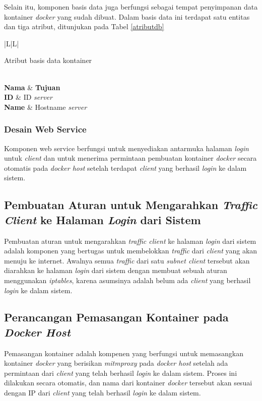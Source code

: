    	Selain itu, komponen basis data juga berfungsi sebagai tempat penyimpanan data kontainer \textit{docker} yang sudah dibuat. Dalam basis data ini terdapat satu entitas dan tiga atribut, ditunjukan pada Tabel \ref{atributdb}
   	\begin{ltabulary}{|L|L|} 
   		\caption{Atribut basis data kontainer} \label{atributdb} \\
   		\hline
   		\textbf{Nama} & \textbf{Tujuan} \\ \hline
   		\endhead
   		\endfoot
   		\endlastfoot
   		\textbf{ID} & ID \textit{server}\\ \hline
   		\textbf{Name} & Hostname \textit{server} \\ \hline
   	\end{ltabulary}
	   
   	\subsubsection{Desain Web Service}
	Komponen web service berfungsi untuk menyediakan antarmuka halaman \textit{login} untuk \textit{client} dan untuk menerima permintaan pembuatan kontainer \textit{docker} secara otomatis pada \textit{docker host} setelah terdapat \textit{client} yang berhasil \textit{login} ke dalam sistem.
	
	\subsection{Pembuatan Aturan untuk Mengarahkan \textit{Traffic Client} ke Halaman \textit{Login} dari Sistem}
	Pembuatan aturan untuk mengarahkan \textit{traffic client} ke halaman \textit{login} dari sistem adalah komponen yang bertugas untuk membelokkan \textit{traffic} dari \textit{client} yang akan menuju ke internet. Awalnya semua \textit{traffic} dari satu \textit{subnet client} tersebut akan diarahkan ke halaman \textit{login} dari sistem dengan membuat sebuah aturan menggunakan \textit{iptables}, karena asumsinya adalah belum ada \textit{client} yang berhasil \textit{login} ke dalam sistem.
   	
    \subsection{Perancangan Pemasangan Kontainer pada \textit{Docker Host}}
	Pemasangan kontainer adalah kompenen yang berfungsi untuk memasangkan kontainer \textit{docker} yang berisikan \textit{mitmproxy} pada \textit{docker host} setelah ada permintaan dari \textit{client} yang telah berhasil \textit{login} ke dalam sistem. Proses ini dilakukan secara otomatis, dan nama dari kontainer \textit{docker} tersebut akan sesuai dengan IP dari \textit{client} yang telah berhasil \textit{login} ke dalam sistem.
	
